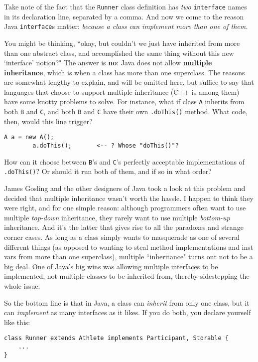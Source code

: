 Take note of the fact that the \texttt{Runner} class definition has
\textit{two} \texttt{interface} names in its declaration line, separated by a
comma. And now we come to the reason Java \texttt{interface}s matter:
\textit{because a class can implement more than one of them.}

You might be thinking, ``okay, but couldn't we just have inherited from more
than one abstract class, and accomplished the same thing without this new
`interface' notion?" The answer is \textbf{no}: Java does not allow
\textbf{multiple inheritance}, which is when a class has more than one
superclass. The reasons are somewhat lengthy to explain, and will be omitted
here, but suffice to say that languages that choose to support multiple
inheritance (C++ is among them) have some knotty problems to solve. For
instance, what if class \texttt{A} inherits from both \texttt{B} and
\texttt{C}, and both \texttt{B} and \texttt{C} have their own
\texttt{.doThis()} method. What code, then, would this line trigger?

\begin{Verbatim}[fontsize=\small,samepage=true]
        A a = new A();
        a.doThis();       <-- ? Whose "doThis()"?
\end{Verbatim}

How can it choose between \texttt{B}'s and \texttt{C}'s perfectly acceptable
implementations of \texttt{.doThis()}? Or should it run both of them, and if
so in what order?

James Gosling and the other designers of Java took a look at this problem and
decided that multiple inheritance wasn't worth the hassle. I happen to think
they were right, and for one simple reason: although programmers often want to
use multiple \textit{top-down} inheritance, they rarely want to use multiple
\textit{bottom-up} inheritance. And it's the latter that gives rise to all the
paradoxes and strange corner cases. As long as a class simply wants to
masquerade as one of several different things (as opposed to wanting to steal
method implementations and inst vars from more than one superclass), multiple
``inheritance" turns out not to be a big deal. One of Java's big wins was
allowing multiple interfaces to be implemented, not multiple classes to be
inherited from, thereby sidestepping the whole issue.

\begin{samepage}
So the bottom line is that in Java, a class can \textit{inherit} from only one
class, but it can \textit{implement} as many interfaces as it likes. If you do
both, you declare yourself like this:

\begin{Verbatim}[fontsize=\small,samepage=true,frame=single]
class Runner extends Athlete implements Participant, Storable {
    ...
}
\end{Verbatim}
\end{samepage}

